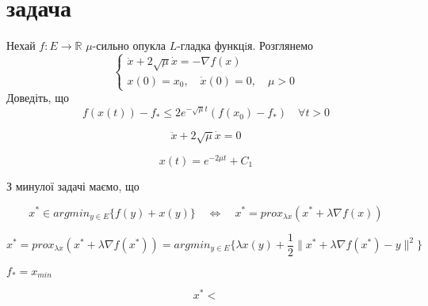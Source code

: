\section{задача}

\begin{tcolorbox}[title=Умова]
    Нехай $f : E \rightarrow \mathbb{R}$  $\mu$-сильно опукла $L$-гладка функцiя. Розглянемо
    $$
    \begin{cases}
        \ddot{x} + 2 \sqrt{\mu} \dot{x} = - \nabla f(x) \\
        x(0) = x_0, \quad \dot{x}(0) = 0, \quad \mu > 0
    \end{cases}
    $$
    Доведіть, що 
    $$ f(x(t)) - f_* \le 2 e^{-\sqrt{\mu}t}(f(x_0) - f_*) \quad \forall t > 0 $$
\end{tcolorbox}


$$
\ddot{x} + 2 \sqrt{\mu} \dot{x} = 0 
$$

$$x(t) = e^{-2\mu t} + C_1$$

З минулої задачі маємо, що


$$x^* \in argmin_{y \in E} \{f(y) + x(y)\} \quad
\Leftrightarrow\quad x^* = prox_{\lambda x}(x^* + \lambda \nabla f(x)) $$

$$x^* = prox_{\lambda x}(x^* + \lambda \nabla f(x^*))= argmin_{y \in E}
\{\lambda x(y) + \frac{1}{2} \|x^* + \lambda \nabla f(x^*) - y\|^2 \}$$

$f_* = x_{min}$


$$x^* <$$
